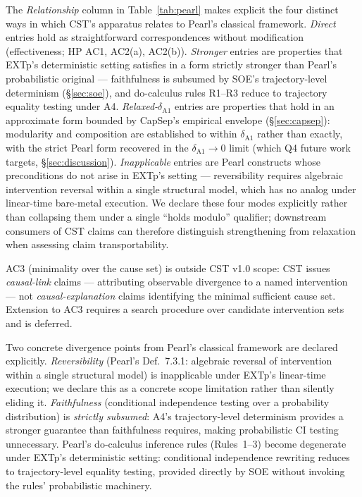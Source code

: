 \documentclass[conference]{IEEEtran}
\begin{document}
The \emph{Relationship} column in Table~\ref{tab:pearl} makes
explicit the four distinct ways in which CST's apparatus relates
to Pearl's classical framework. \emph{Direct} entries hold as
straightforward correspondences without modification
(effectiveness; HP AC1, AC2(a), AC2(b)). \emph{Stronger} entries
are properties that EXTp's deterministic setting satisfies in a
form strictly stronger than Pearl's probabilistic original ---
faithfulness is subsumed by SOE's trajectory-level determinism
(\S\ref{sec:soe}), and do-calculus rules R1--R3 reduce to
trajectory equality testing under A4. \emph{Relaxed-$\delta_{\text{A1}}$}
entries are properties that hold in an approximate form bounded by
CapSep's empirical envelope (\S\ref{sec:capsep}): modularity and
composition are established to within $\delta_{\text{A1}}$ rather
than exactly, with the strict Pearl form recovered in the
$\delta_{\text{A1}} \to 0$ limit (which Q4 future work targets,
\S\ref{sec:discussion}). \emph{Inapplicable} entries are Pearl
constructs whose preconditions do not arise in EXTp's setting ---
reversibility requires algebraic intervention reversal within a
single structural model, which has no analog under linear-time
bare-metal execution. We declare these four modes explicitly
rather than collapsing them under a single ``holds modulo''
qualifier; downstream consumers of CST claims can therefore
distinguish strengthening from relaxation when assessing claim
transportability.

AC3 (minimality over the cause set) is outside CST v1.0 scope: CST
issues \emph{causal-link} claims --- attributing observable
divergence to a named intervention --- not
\emph{causal-explanation} claims identifying the minimal sufficient
cause set. Extension to AC3 requires a search procedure over
candidate intervention sets and is deferred.

Two concrete divergence points from Pearl's classical framework are
declared explicitly. \emph{Reversibility} (Pearl's Def.~7.3.1:
algebraic reversal of intervention within a single structural model)
is inapplicable under EXTp's linear-time execution; we declare this
as a concrete scope limitation rather than silently eliding it.
\emph{Faithfulness} (conditional independence testing over a
probability distribution) is \emph{strictly subsumed}: A4's
trajectory-level determinism provides a stronger guarantee than
faithfulness requires, making probabilistic CI testing unnecessary.
Pearl's do-calculus inference rules (Rules~1--3) become degenerate
under EXTp's deterministic setting: conditional independence
rewriting reduces to trajectory-level equality testing, provided
directly by SOE without invoking the rules' probabilistic machinery.
\end{document}
